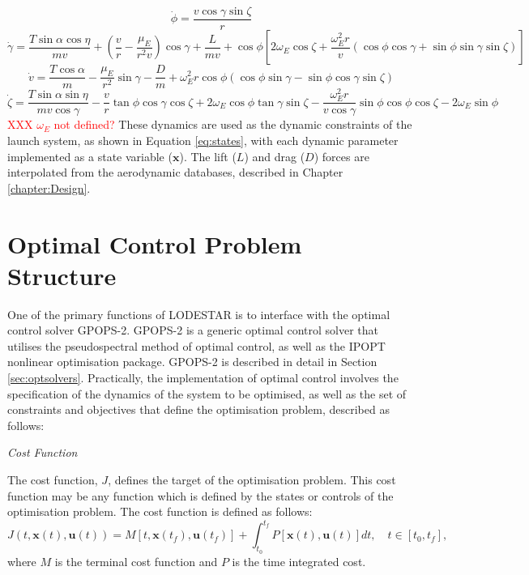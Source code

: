 \begin{equation}
\dot{\phi} = \frac{v\cos\gamma\sin\zeta}{r}
\end{equation}
\begin{equation}
\dot{\gamma} = \frac{T\sin\alpha \cos\eta}{mv} + (\frac{v}{r}-\frac{\mu_E}{r^2 v})\cos\gamma + \frac{L}{mv}
+ \cos\phi[2\omega_E \cos\zeta + \frac{\omega_E^2 r}{v}(\cos\phi\cos\gamma+\sin\phi\sin\gamma\sin\zeta)]
\end{equation}
\begin{equation}
\dot{v} = \frac{T\cos\alpha}{m}-\frac{\mu_E}{r^2}\sin\gamma - \frac{D}{m}
+ \omega_E^2 r\cos\phi(\cos\phi\sin\gamma-\sin\phi\cos\gamma\sin\zeta)
\end{equation}
\begin{equation}\label{eq:heading}
\dot{\zeta} = \frac{T\sin\alpha \sin\eta}{mv \cos \gamma}-\frac{v}{r}\tan\phi\cos\gamma\cos\zeta +2\omega_E\cos\phi\tan\gamma\sin\zeta - \frac{\omega_E^2 r}{v\cos\gamma}\sin\phi\cos\phi\cos\zeta-2\omega_E\sin\phi 
\end{equation}
\textcolor{red}{XXX $\omega_E$ not defined?}
These dynamics are used as the dynamic constraints of the launch system, as shown in Equation \ref{eq:states}, with each dynamic parameter implemented as a state variable ($\mathbf{x}$). The lift ($L$) and drag ($D$) forces are interpolated from the aerodynamic databases, described in Chapter \ref{chapter:Design}.

\section{Optimal Control Problem Structure}\label{sec:optstruct}

One of the primary functions of LODESTAR is to interface with the optimal control solver GPOPS-2. GPOPS-2 is a generic optimal control solver that utilises the pseudospectral method of optimal control, as well as the IPOPT nonlinear optimisation package. GPOPS-2 is described in detail in Section \ref{sec:optsolvers}. Practically, the implementation of optimal control involves the specification of the dynamics of the system to be optimised, as well as the set of constraints and objectives that define the optimisation problem, described as follows:

\noindent \textit{Cost Function}

\noindent The cost function, $J$, defines the target of the optimisation problem. 
This cost function may be any function which is defined by the states or controls of the optimisation problem. The cost function is defined as follows:
\begin{equation} \label{eq:cost}
J(t,\textbf{x}(t),\textbf{u}(t)) = M[t,\textbf{x}(t_f),\textbf{u}(t_f)] +   \int_{t_0}^{t_f} P[\textbf{x}(t),\textbf{u}(t)] dt, \quad t \in [t_0,t_f],
\end{equation}
where $M$ is the terminal cost function and $P$ is the time integrated cost. 

